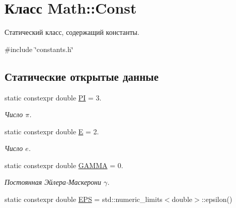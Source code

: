 \hypertarget{class_math_1_1_const}{}\section{Класс Math\+:\+:Const}
\label{class_math_1_1_const}


Статический класс, содержащий константы.  




{\ttfamily \#include \char`\"{}constants.\+h\char`\"{}}

\subsection*{Статические открытые данные}
\begin{DoxyCompactItemize}
\item 
\hypertarget{class_math_1_1_const_af38bf8b7900394c82b8cc61d56a1d761}{}\label{class_math_1_1_const_af38bf8b7900394c82b8cc61d56a1d761} 
static constexpr double \hyperlink{class_math_1_1_const_af38bf8b7900394c82b8cc61d56a1d761}{PI} = 3.
\begin{DoxyCompactList}\small\item\em Число $\pi$. \end{DoxyCompactList}\item 
\hypertarget{class_math_1_1_const_a48120c3c268ef1ebb4533908ae0c920f}{}\label{class_math_1_1_const_a48120c3c268ef1ebb4533908ae0c920f} 
static constexpr double \hyperlink{class_math_1_1_const_a48120c3c268ef1ebb4533908ae0c920f}{E} = 2.
\begin{DoxyCompactList}\small\item\em Число $e$. \end{DoxyCompactList}\item 
\hypertarget{class_math_1_1_const_ad1d689a22e84a3c7e49a47cf80b3050f}{}\label{class_math_1_1_const_ad1d689a22e84a3c7e49a47cf80b3050f} 
static constexpr double \hyperlink{class_math_1_1_const_ad1d689a22e84a3c7e49a47cf80b3050f}{G\+A\+M\+MA} = 0.
\begin{DoxyCompactList}\small\item\em Постоянная Эйлера-\/Маскерони $\gamma$. \end{DoxyCompactList}\item 
\hypertarget{class_math_1_1_const_a7058de10aeb68c8ac5df5a7346278d15}{}\label{class_math_1_1_const_a7058de10aeb68c8ac5df5a7346278d15} 
static constexpr double \hyperlink{class_math_1_1_const_a7058de10aeb68c8ac5df5a7346278d15}{E\+PS} = std\+::numeric\+\_\+limits$<$double$>$\+::epsilon()

\end{DoxyCompactItemize}
